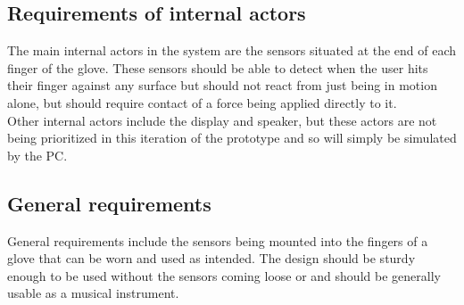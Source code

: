 


\subsection{Requirements of internal actors}
The main internal actors in the system are the sensors situated at the end of each finger of the glove. These sensors should be able to detect when the user hits their finger against any surface but should not react from just being in motion alone, but should require contact of a force being applied directly to it. \\
Other internal actors include the display and speaker, but these actors are not being prioritized in this iteration of the prototype and so will simply be simulated by the PC.

\subsection{General requirements}
General requirements include the sensors being mounted into the fingers of a glove that can be worn and used as intended. The design should be sturdy enough to be used without the sensors coming loose or and should be generally usable as a musical instrument.


